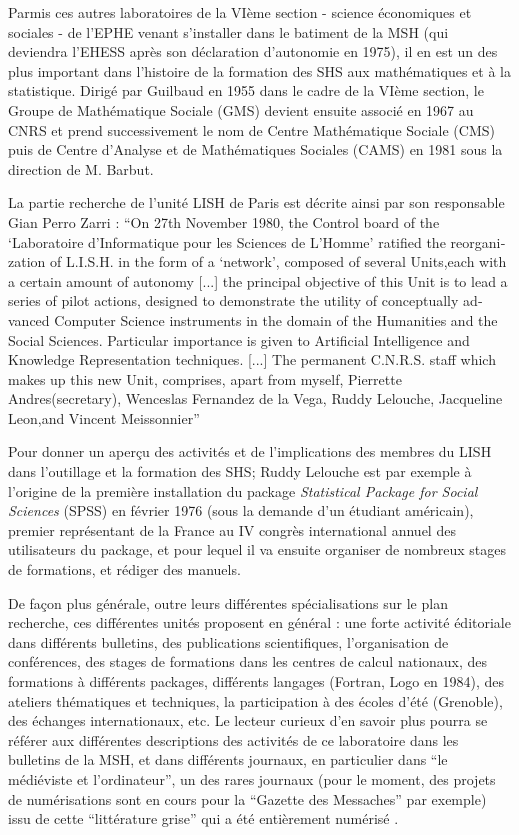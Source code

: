 
Parmis ces autres laboratoires de la VIème section - science économiques et sociales - de l'EPHE venant s'installer dans le batiment de la MSH (qui deviendra l'EHESS après son déclaration d'autonomie en 1975), il en est un des plus important dans l'histoire de la formation des SHS aux mathématiques et à la statistique. Dirigé par Guilbaud en 1955 dans le cadre de la VIème section, le Groupe de Mathématique Sociale (GMS) devient ensuite associé en 1967 au CNRS et prend successivement le nom de Centre Mathématique Sociale (CMS) puis de Centre d’Analyse et de Mathématiques Sociales (CAMS) en 1981 sous la direction de M. Barbut.

La partie recherche de l'unité LISH de Paris est décrite ainsi par son responsable Gian Perro Zarri : \foreignquote{english}{On 27th November 1980, the Control board of the \enquote{Laboratoire d'Informatique pour les Sciences de L'Homme} ratified the reorganization of L.I.S.H. in the form of a \enquote{network}, composed of several Units,each with a certain amount of autonomy [...] the principal objective of this Unit is to lead a series of pilot actions, designed to demonstrate the utility of conceptually advanced Computer Science instruments in the domain of the Humanities and the Social Sciences. Particular importance is given to Artificial Intelligence and Knowledge Representation techniques. [...]  The permanent C.N.R.S. staff which makes up this new Unit, comprises, apart from myself, Pierrette Andres(secretary), Wenceslas Fernandez de la Vega, Ruddy Lelouche, Jacqueline Leon,and Vincent Meissonnier} \autocite{Zarri1981}

Pour donner un aperçu des activités et de l'implications des membres du LISH dans l'outillage et la formation des SHS; Ruddy Lelouche est par exemple à l'origine de la première installation du package \textit{Statistical Package for Social Sciences} (SPSS) en février 1976 (sous la demande d'un étudiant américain), premier représentant de la France au IV congrès international annuel des utilisateurs du package, et pour lequel il va ensuite organiser de nombreux stages de formations, et rédiger des manuels.

De façon plus générale, outre leurs différentes spécialisations sur le plan recherche, ces différentes unités proposent en général : une forte activité éditoriale dans différents bulletins, des publications scientifiques, l'organisation de conférences, des stages de formations dans les centres de calcul nationaux, des formations à différents packages, différents langages (Fortran, Logo en 1984), des ateliers thématiques et techniques, la participation à des écoles d'été (Grenoble), des échanges internationaux, etc. Le lecteur curieux d'en savoir plus pourra se référer aux différentes descriptions des activités de ce laboratoire dans les bulletins de la MSH, et dans différents journaux, en particulier dans \enquote{le médiéviste et l'ordinateur}, un des rares journaux (pour le moment, des projets de numérisations sont en cours pour la \enquote{Gazette des Messaches} par exemple) issu de cette \enquote{littérature grise} qui a été entièrement numérisé .

